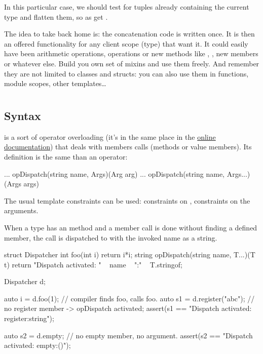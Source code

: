 In this particular case, we should test for tuples already containing the current type and flatten them, so as get .

The idea to take back home is: the concatenation code is written once. It is then an offered functionality for any client scope (type) that want it. It could easily have been arithmetic operations,  operations or new methods like , , new members or whatever else. Build you own set of mixins and use them freely. And remember they are not limited to classes and structs: you can also use them in functions, module scopes, other templates\ldots


\section{} \label{opdispatch}

\subsection{Syntax}\label{opdispatchsyntax}

 is a sort of operator overloading (it's in the same place in the \href{www.dlang.org/operator.html}{online documentation}) that deals with members calls (methods or value members). Its definition is the same than an operator:

\begin{dcode}
... opDispatch(string name, Args)(Arg arg)
... opDispatch(string name, Args...)(Args args)
\end{dcode}

The usual template constraints can be used: constraints on , constraints on the arguments.

When a type has an  method and a member call is done without finding a defined member, the call is dispatched to  with the invoked name as a string.

\begin{dcode}
struct Dispatcher
{
    int foo(int i) { return i*i;}
    string opDispatch(string name, T...)(T t)
    {
        return "Dispatch activated: " ~ name ~ ":" ~ T.stringof;
    }
}

Dispatcher d;

auto i = d.foo(1); // compiler finds foo, calls foo.
auto s1 = d.register("abc"); // no register member -> opDispatch activated;
assert(s1 == "Dispatch activated: register:string");

auto s2 = d.empty; // no empty member, no argument.
assert(s2 == "Dispatch activated: empty:()");
\end{dcode}


